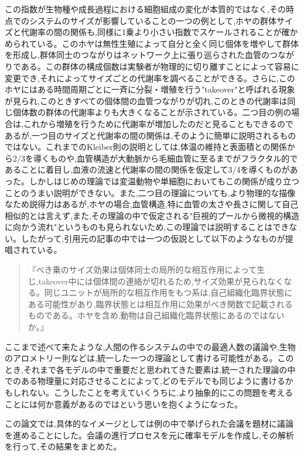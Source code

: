 この指数が生物種や成長過程における細胞組成の変化が本質的ではなく,その時点でのシステムのサイズが影響していることの一つの例として,ホヤの群体サイズと代謝率の間の関係も,同様に1乗より小さい指数でスケールされることが確かめられている。このホヤは無性生殖によって自分と全く同じ個体を増やして群体を形成し,群体同士のつながりはネットワーク上に張り巡らされた血管のつながりである。この群体の構成個数は実験者が物理的に切り離すことによって容易に変更でき,それによってサイズごとの代謝率を調べることができる。さらに,このホヤにはある時間周期ごとに一斉に分裂・増殖を行う"takeover"と呼ばれる現象が見られ,このときすべての個体間の血管つながりが切れ,このときの代謝率は同じ個体数の群体の代謝率よりも大きくなることが示されている。二つ目の例の場合は,これから増殖を行うために代謝率が増加したのだと見ることもできるのであるが,一つ目のサイズと代謝率の間の関係は,そのように簡単に説明されるものではない。これまでのKleiber則の説明としては,体温の維持と表面積との関係から2/3を導くものや,血管構造が大動脈から毛細血管に至るまでがフラクタル的であることに着目し,血液の流速と代謝率の間の関係を仮定して3/4を導くものがあった。しかしはじめの理論では変温動物や単細胞においてもこの関係が成り立つことのうまい説明ができない。また,二つ目の理論についても,より物理的な描像なため説得力はあるが,ホヤの場合,血管構造,特に血管の太さや長さに関して自己相似的とは言えず,また,その理論の中で仮定される"巨視的プールから微視的構造に向かう流れ"というものも見られないため,この理論では説明することはできない。したがって,引用元の記事の中では一つの仮説として以下のようなものが提唱されている。

\begin{quote}
『べき乗のサイズ効果は個体同士の局所的な相互作用によって生じ,takeover中には個体間の連絡が切れるため,サイズ効果が見られなくなる。同じユニットが局所的な相互作用をもつ系は,自己組織化臨界状態にある可能性があり,臨界状態とは相互作用に効果がべき関数で記載されるものである。ホヤを含め,動物は自己組織化臨界状態にあるのではないか。』
\end{quote}

ここまで述べて来たような,人間の作るシステムの中での最適人数の議論や,生物のアロメトリー則などは,統一した一つの理論として書ける可能性がある。このとき,それまで各モデルの中で重要だと思われてきた要素は,統一された理論の中でのある物理量に対応させることによって,どのモデルでも同じように書けるかもしれない。こうしたことを考えていくうちに,より抽象的にこの問題を考えることには何か意義があるのではという思いを抱くようになった。

この論文では,具体的なイメージとしては例の中で挙げられた会議を題材に議論を進めることにした。会議の進行プロセスを元に確率モデルを作成し,その解析を行って,その結果をまとめた。
